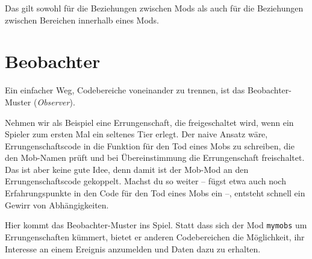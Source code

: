 Das gilt sowohl für die Beziehungen zwischen Mods als auch für die
Beziehungen zwischen Bereichen innerhalb eines Mods.

\section{Beobachter}\label{beobachter}

Ein einfacher Weg, Codebereiche voneinander zu trennen, ist das
Beobachter-Muster (\emph{Observer}).

Nehmen wir als Beispiel eine Errungenschaft, die freigeschaltet wird,
wenn ein Spieler zum ersten Mal ein seltenes Tier erlegt. Der naive
Ansatz wäre, Errungenschaftscode in die Funktion für den Tod eines Mobs
zu schreiben, die den Mob-Namen prüft und bei Übereinstimmung die
Errungenschaft freischaltet. Das ist aber keine gute Idee, denn damit
ist der Mob-Mod an den Errungenschaftscode gekoppelt. Machst du so
weiter -- fügst etwa auch noch Erfahrungspunkte in den Code für den Tod
eines Mobs ein --, entsteht schnell ein Gewirr von Abhängigkeiten.

Hier kommt das Beobachter-Muster ins Spiel. Statt dass sich der Mod
\texttt{mymobs} um Errungenschaften kümmert, bietet er anderen
Codebereichen die Möglichkeit, ihr Interesse an einem Ereignis
anzumelden und Daten dazu zu erhalten.

\begin{Shaded}
\begin{Highlighting}[]
 \OperatorTok{=} \OperatorTok{\{\}}
 \OperatorTok{(}\OperatorTok{)}
    \OperatorTok{(}\OperatorTok{,} \OperatorTok{)}

  \OperatorTok{=} \OperatorTok{,} \OperatorTok{\#} 
    \OperatorTok{[}\OperatorTok{](}\OperatorTok{,} \OperatorTok{)}
\end{Highlighting}
\end{Shaded}

